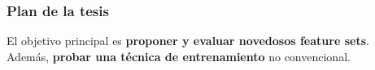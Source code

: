 \begin{frame}
\frametitle{Plan de la tesis}
El objetivo principal es \textbf{proponer y evaluar novedosos feature sets}. \\
\vspace{3em}
\pause
Además, \textbf{probar una técnica de entrenamiento} no convencional.
\end{frame}
